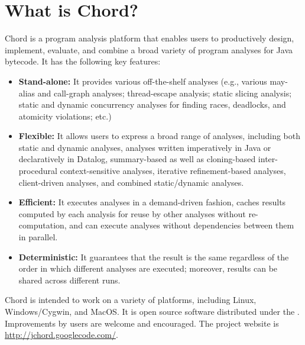 \chapter{What is Chord?}
\label{chap:whatis-chord}

Chord is a program analysis platform that enables users to
productively design, implement, evaluate, and combine a
broad variety of program analyses for Java bytecode. It has the
following key features:

\begin{itemize}
\item

{\bf Stand-alone:} It provides various off-the-shelf analyses (e.g., various
may-alias and call-graph analyses; thread-escape analysis;
static slicing analysis; static and dynamic concurrency analyses for finding
races, deadlocks, and atomicity violations; etc.)

\item

{\bf Flexible:} It allows users to express a broad range of analyses,
including both static and dynamic analyses, analyses written
imperatively in Java or declaratively in Datalog, summary-based as
well as cloning-based inter-procedural context-sensitive analyses,
iterative refinement-based analyses, client-driven analyses, and
combined static/dynamic analyses.

\item

{\bf Efficient:} It executes analyses in a demand-driven fashion, caches
results computed by each analysis for reuse by other analyses without
re-computation, and can execute analyses without dependencies between
them in parallel.

\item

{\bf Deterministic:} It guarantees that the result is the same regardless of
the order in which different analyses are executed; moreover, results
can be shared across different runs.
\end{itemize}

Chord is intended to work on a variety of platforms,
including Linux, Windows/Cygwin, and MacOS.
It is open source software distributed under
the .
Improvements by users are welcome and encouraged.  The project website
is \url{http://jchord.googlecode.com/}.


